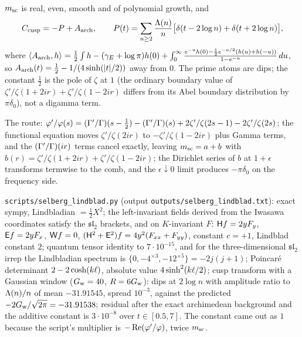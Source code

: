\begin{proposition}
\label{prop:cusp-prime-comb}
$m_{\mathrm{sc}}$ is real, even, smooth and of polynomial growth, and
$$
C_{\mathrm{cusp}} = -P + A_{\mathrm{arch}},\qquad
P(t) = \sum_{n\ge2}\frac{\Lambda(n)}{n}\big[\delta(t-2\log n)+\delta(t+2\log n)\big],
$$
where $\langle A_{\mathrm{arch}},h\rangle = \tfrac12\int h - (\gamma_E+\log\pi)h(0) +
\int_0^\infty\frac{e^{-u}h(0)-\frac12e^{-u/2}(h(u)+h(-u))}{1-e^{-u}}\,du$,
so $A_{\mathrm{arch}}(t) = \tfrac12 - 1/(4\sinh(|t|/2))$ away from $0$. The prime atoms
are dips; the constant $\tfrac12$ is the pole of $\zeta$ at $1$ (the ordinary
boundary value of $\zeta'/\zeta(1+2ir)+\zeta'/\zeta(1-2ir)$ differs from its
Abel boundary distribution by $\pi\delta_0$), not a digamma term.
\end{proposition}

The route: $\varphi'/\varphi(s) = (\Gamma'/\Gamma)(s-\tfrac12)-(\Gamma'/\Gamma)(s) +
2\zeta'/\zeta(2s-1) - 2\zeta'/\zeta(2s)$; the functional equation moves
$\zeta'/\zeta(2ir)$ to $-\zeta'/\zeta(1-2ir)$ plus Gamma terms, and the
$(\Gamma'/\Gamma)(ir)$ terms cancel exactly, leaving $m_{\mathrm{sc}} = a + b$ with
$b(r) = \zeta'/\zeta(1+2ir)+\zeta'/\zeta(1-2ir)$; the Dirichlet series of $b$
at $1+\epsilon$ transforms termwise to the comb, and the $\epsilon\downarrow0$
limit produces $-\pi\delta_0$ on the frequency side.

\begin{numerical}
\label{num:selberg-lindblad}
\texttt{scripts/selberg\_lindblad.py} (output \texttt{outputs/selberg\_lindblad.txt}):
exact sympy, Lindbladian $= \tfrac12X^2$; the left-invariant fields derived
from the Iwasawa coordinates satisfy the $\mathfrak{sl}_2$ brackets, and on
$K$-invariant $F$: $\mathsf H f = 2yF_y$, $\mathsf E f = 2yF_x$, $\mathsf W f = 0$,
$(\mathsf H^2+\mathsf E^2)f = 4y^2(F_{xx}+F_{yy})$, constant $c = +1$, Lindblad
constant $2$; quantum tensor identity to $7\cdot10^{-15}$, and for the
three-dimensional $\mathfrak{sl}_2$ irrep the Lindbladian spectrum is
$\{0,-4^{\times3},-12^{\times5}\} = -2j(j+1)$; Poincar\'e determinant
$2-2\cosh(k\ell)$, absolute value $4\sinh^2(k\ell/2)$; cusp transform with a
Gaussian window ($G_{\mathrm w} = 40$, $R = 6G_{\mathrm w}$): dips at $2\log n$ with amplitude
ratio to $\Lambda(n)/n$ of mean $-31.91545$, spread $10^{-3}$, against the
predicted $-2G_{\mathrm w}/\sqrt{2\pi} = -31.91538$; residual after the exact
archimedean background and the additive constant is $3\cdot10^{-8}$ over
$t\in[0.5,7]$. The constant came out as $1$ because the script's multiplier is
$-\operatorname{Re}(\varphi'/\varphi)$, twice $m_{\mathrm{sc}}$.
\end{numerical}

